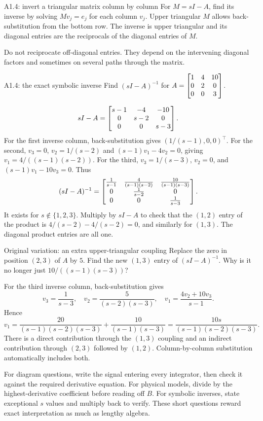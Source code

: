 \begin{method}{A1.4: invert a triangular matrix column by column}
For $M=sI-A$, find its inverse by solving $Mv_j=e_j$ for each column $v_j$. Upper triangular $M$ allows back-substitution from the bottom row. The inverse is upper triangular and its diagonal entries are the reciprocals of the diagonal entries of $M$.

Do not reciprocate off-diagonal entries. They depend on the intervening diagonal factors and sometimes on several paths through the matrix.
\end{method}
\begin{question}{A1.4: the exact symbolic inverse}
Find $(sI-A)^{-1}$ for $A=\begin{bmatrix}1&4&10\\0&2&0\\0&0&3\end{bmatrix}$.
\end{question}
\begin{answer}
\[sI-A=\begin{bmatrix}s-1&-4&-10\\0&s-2&0\\0&0&s-3\end{bmatrix}.\]
For the first inverse column, back-substitution gives $(1/(s-1),0,0)^{\top}$. For the second, $v_3=0$, $v_2=1/(s-2)$ and $(s-1)v_1-4v_2=0$, giving $v_1=4/((s-1)(s-2))$. For the third, $v_3=1/(s-3)$, $v_2=0$, and $(s-1)v_1-10v_3=0$. Thus
\[(sI-A)^{-1}=\begin{bmatrix}
\frac1{s-1}&\frac4{(s-1)(s-2)}&\frac{10}{(s-1)(s-3)}\\
0&\frac1{s-2}&0\\
0&0&\frac1{s-3}\end{bmatrix}.\]
It exists for $s\notin\{1,2,3\}$. Multiply by $sI-A$ to check that the $(1,2)$ entry of the product is $4/(s-2)-4/(s-2)=0$, and similarly for $(1,3)$. The diagonal product entries are all one.
\end{answer}
\begin{question}{Original variation: an extra upper-triangular coupling}
Replace the zero in position $(2,3)$ of $A$ by $5$. Find the new $(1,3)$ entry of $(sI-A)^{-1}$. Why is it no longer just $10/((s-1)(s-3))$?
\end{question}
\begin{answer}
For the third inverse column, back-substitution gives
\[v_3=\frac1{s-3},\quad v_2=\frac5{(s-2)(s-3)},\quad v_1=\frac{4v_2+10v_3}{s-1}.\]
Hence
\[v_1=\frac{20}{(s-1)(s-2)(s-3)}+\frac{10}{(s-1)(s-3)}=\frac{10s}{(s-1)(s-2)(s-3)}.\]
There is a direct contribution through the $(1,3)$ coupling and an indirect contribution through $(2,3)$ followed by $(1,2)$. Column-by-column substitution automatically includes both.
\end{answer}
\begin{tip}
For diagram questions, write the signal entering every integrator, then check it against the required derivative equation. For physical models, divide by the highest-derivative coefficient before reading off $B$. For symbolic inverses, state exceptional $s$ values and multiply back to verify. These short questions reward exact interpretation as much as lengthy algebra.
\end{tip}

